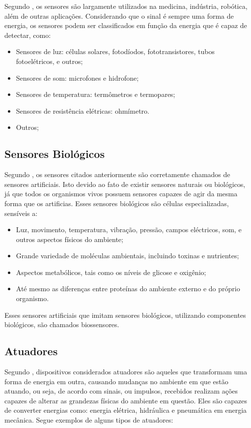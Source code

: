 Segundo \cite{nomadusp2014}, os sensores são largamente utilizados na medicina, indústria, robótica, além de outras aplicações. Considerando que o sinal é sempre uma forma de energia, os sensores podem ser classificados em função da energia que é capaz de detectar, como:

\begin{itemize}
\item Sensores de luz: células solares, fotodíodos, fototransistores, tubos fotoelétricos, e outros;
\item Sensores de som: microfones e hidrofone;
\item Sensores de temperatura: termômetros e termopares;
\item Sensores de resistência elétricas: ohmímetro. 
\item Outros;
\end{itemize}

\subsection{Sensores Biológicos}
Segundo \cite{nomadusp2014}, os sensores citados anteriormente são corretamente chamados de sensores artificiais. Isto devido ao fato de existir sensores naturais ou biológicos, já que todos os organismos vivos possuem sensores capazes de agir da mesma forma que os artificias. Esses sensores biológicos são células especializadas, sensíveis a:

\begin{itemize}
\item Luz, movimento, temperatura, vibração, pressão, campos eléctricos, som, e outros aspectos físicos do ambiente;
\item Grande variedade de moléculas ambientais, incluindo toxinas e nutrientes;
\item Aspectos metabólicos, tais como os níveis de glicose e oxigênio;
\item Até mesmo as diferenças entre proteínas do ambiente externo e do próprio organismo.
\end{itemize}

Esses sensores artificiais que imitam sensores biológicos, utilizando componentes biológicos, são chamados biossensores.

\subsection{Atuadores}
Segundo \cite{chironis1991mechanisms}, dispositivos considerados atuadores são aqueles que transformam uma forma de energia em outra, causando mudanças no ambiente em que estão atuando, ou seja, de acordo com sinais, ou impulsos, recebidos realizam ações capazes de alterar as grandezas físicas do ambiente em questão. Eles são capazes de converter energias como: energia elétrica, hidráulica e pneumática em energia mecânica. Segue exemplos de alguns tipos de atuadores:

